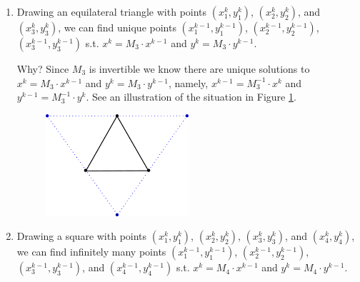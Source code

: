 \documentclass{article}
\begin{document}
\begin{enumerate}[label = (\arabic*)]
	\item Drawing an equilateral triangle with points $(x_1^k, y_1^k)$, $(x_2^k, y_2^k)$, and $(x_3^k, y_3^k)$, we can find unique points $(x_1^{k-1}, y_1^{k-1})$, $(x_2^{k-1}, y_2^{k-1})$, $(x_3^{k-1}, y_3^{k-1})$ s.t. $x^k = M_3\cdot x^{k-1}$ and $y^k = M_3\cdot y^{k-1}$. 
	
	Why? Since $M_3$ is invertible we know there are unique solutions to $x^k = M_3\cdot x^{k-1}$ and $y^k = M_3\cdot y^{k-1}$, namely, $x^{k-1} = M_3^{-1}\cdot x^{k}$ and $y^{k-1} = M_3^{-1}\cdot y^{k}$. See an illustration of the situation in Figure \ref{fig:ex_2_6}.
	\begin{figure}[H]
		\centering
		\includegraphics[width=0.5\textwidth]{exercise_2_6}
		\label{fig:ex_2_6}
	\end{figure}

	\item Drawing a square with points $(x_1^k, y_1^k)$, $(x_2^k, y_2^k)$, $(x_3^k, y_3^k)$, and $(x_4^k, y_4^k)$, we can find infinitely many points $(x_1^{k-1}, y_1^{k-1})$, $(x_2^{k-1}, y_2^{k-1})$, $(x_3^{k-1}, y_3^{k-1})$, and $(x_4^{k-1}, y_4^{k-1})$ s.t. $x^k = M_4\cdot x^{k-1}$ and $y^k = M_4\cdot y^{k-1}$. 
	

\end{enumerate}
\end{document}
